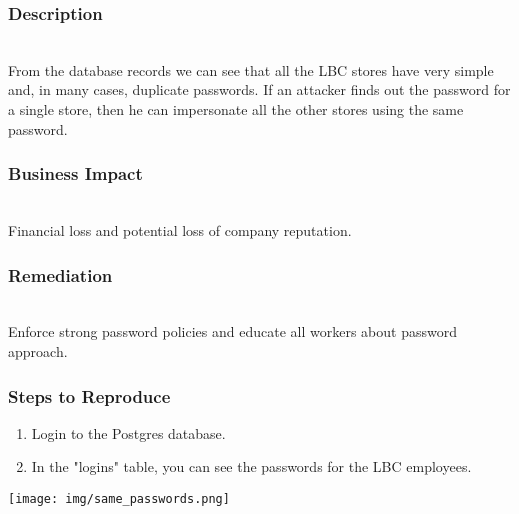 \documentclass{article}
\begin{document}
\subsubsection*{Description} \\	From the database records we can see that all the LBC stores have very simple and, in many cases, duplicate passwords. If an attacker finds out the password for a single store, then he can impersonate all the other stores using the same password.

\subsubsection*{Business Impact} \\	Financial loss and potential loss of company reputation.

\subsubsection*{Remediation} \\	Enforce strong password policies and educate all workers about password approach.
\subsubsection*{Steps to Reproduce}\begin{enumerate}
\item Login to the Postgres database.
\item In the "logins" table, you can see the passwords for the LBC employees.
\end{enumerate}
\texttt{[image: img/same\_passwords.png]}
\newpage
\end{document}
